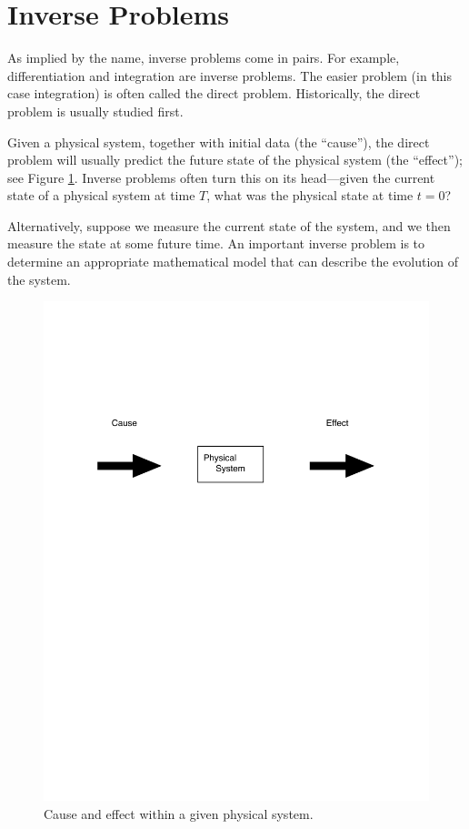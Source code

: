 \section*{Inverse Problems}
As implied by the name, inverse problems come in pairs.
For example, differentiation and integration are inverse problems.
The easier problem (in this case integration) is often called the direct problem.
Historically, the direct problem is usually studied first.

Given a physical system, together with initial data (the ``cause''), the direct problem will usually predict the future state of the physical system (the ``effect''); see Figure \ref{fig:cause_and_effect}.
Inverse problems often turn this on its head---given the current state of a physical system at time $T$, what was the physical state at time $t = 0$?

Alternatively, suppose we measure the current state of the system, and we then measure the state at some future time.
An important inverse problem is to determine an appropriate mathematical model that can describe the evolution of the system.

\begin{figure}
\centering
\includegraphics[width=\textwidth]{figures/cause_and_effect.pdf}
\caption{Cause and effect within a given physical system.}
\label{fig:cause_and_effect}
\end{figure}


